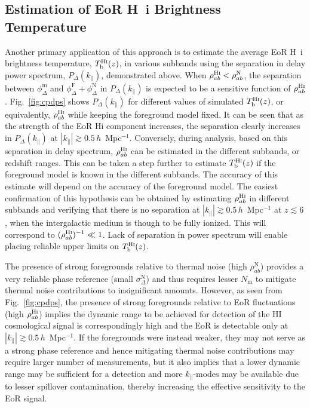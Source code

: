 \documentclass[
reprint,
superscriptaddress,
amsmath,
amssymb,
aps,
prd
]{revtex4-1}
\begin{document}
\subsection{Estimation of EoR H~{\sc i} Brightness Temperature}\label{sec:spin-temp}

Another primary application of this approach is to estimate the average EoR H~{\sc i} brightness temperature, $T_\textrm{b}^\textrm{H{\sc i}}(z)$, in various subbands using the separation in delay power spectrum, $P_\Delta(k_\parallel)$, demonstrated above. When $\rho_{ab}^\textrm{H{\sc i}} < \rho_{ab}^\textrm{N}$, the separation between $\phi_\Delta^\textrm{m}$ and $\phi_\Delta^\textrm{F} + \phi_\Delta^\textrm{N}$ in $P_\Delta(k_\parallel)$ is expected to be a sensitive function of $\rho_{ab}^\textrm{H{\sc i}}$. Fig.~\ref{fig:cpdps} shows $P_\Delta(k_\parallel)$ for different values of simulated $T_\textrm{b}^\textrm{H{\sc i}}(z)$, or equivalently, $\rho_{ab}^\textrm{H{\sc i}}$ while keeping the foreground model fixed. It can be seen that as the strength of the EoR H{\sc i} component increases, the separation clearly increases in $P_\Delta(k_\parallel)$ at $|k_\parallel| \gtrsim 0.5\,h$~Mpc$^{-1}$. Conversely, during analysis, based on this separation in delay spectrum, $\rho_{ab}^\textrm{H{\sc i}}$ can be estimated in the different subbands, or redshift ranges. This can be taken a step further to estimate $T_\textrm{b}^\textrm{H{\sc i}}(z)$ if the foreground model is known in the different subbands. The accuracy of this estimate will depend on the accuracy of the foreground model. The easiest confirmation of this hypothesis can be obtained by estimating $\rho_{ab}^\textrm{H{\sc i}}$ in different subbands and verifying that there is no separation at $|k_\parallel| \gtrsim 0.5\,h$~Mpc$^{-1}$ at $z\lesssim 6$, when the intergalactic medium is though to be fully ionized. This will correspond to $(\rho_{ab}^\textrm{H{\sc i}})^{-1} \ll 1$. Lack of separation in power spectrum will enable placing reliable upper limits on $T_\textrm{b}^\textrm{H{\sc i}}(z)$.

The presence of strong foregrounds relative to thermal noise (high $\rho_{ab}^\textrm{N}$) provides a very reliable phase reference (small $\sigma_\Delta^\textrm{N}$) and thus requires lesser $N_\textrm{m}$ to mitigate thermal noise contributions to insignificant amounts. However, as seen from Fig.~\ref{fig:cpdps}, the presence of strong foregrounds relative to EoR fluctuations (high $\rho_{ab}^\textrm{H{\sc i}}$) implies the dynamic range to be achieved for detection of the HI cosmological signal is correspondingly high and the EoR is detectable only at $|k_\parallel| \gtrsim 0.5\,h$~Mpc$^{-1}$. If the foregrounds were instead weaker, they may not serve as a strong phase reference and hence mitigating thermal noise contributions may require larger number of measurements, but it also implies that a lower dynamic range may be sufficient for a detection and more $k_\parallel$-modes may be available due to lesser spillover contamination, thereby increasing the effective sensitivity to the EoR signal. 
\end{document}
